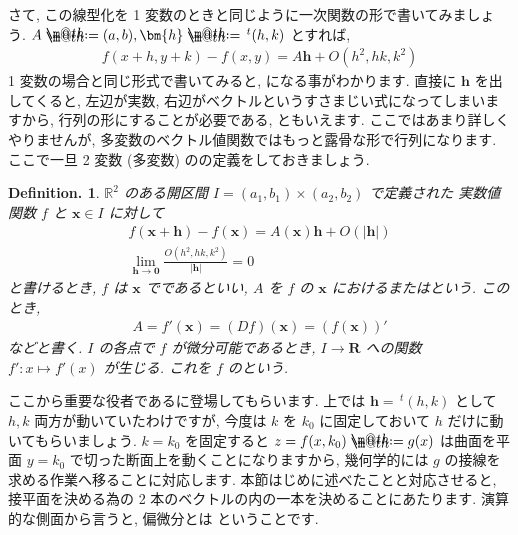 \documentclass[openany, a4paper, oneside]{book}
\makeatletter
\newcommand*{\defeq}{\mathrel{\rlap{%
\raisebox{0.3ex}{$\m@th\cdot$}}%
\raisebox{-0.3ex}{$\m@th\cdot$}}%
=}
\theoremstyle{break}
\theoremstyle{breakdefn}
\newtheorem{defn}[thm]{Definition.}
\newcommand{\bbR}{\mathbb{R}}
\makeatother
\begin{document}
さて, この線型化を 1 変数のときと同じように一次関数の形で書いてみましょう.
 $A\defeq(a,b),\bm{h}\defeq\,^t (h,k)$ とすれば,
    \begin{align}
        f (x+h,y+k) - f (x,y)
        =
        A \bm{h} + O (h^2,hk,k^2)
    \end{align}
1 変数の場合と同じ形式で書いてみると, になる事がわかります.
直接に $\bm{h}$ を出してくると, 左辺が実数, 右辺がベクトルというすさまじい式になってしまいますから, 行列の形にすることが必要である, ともいえます.
ここではあまり詳しくやりませんが, 多変数のベクトル値関数ではもっと露骨な形で行列になります.
ここで一旦 2 変数 (多変数) のの定義をしておきましょう.
    \begin{defn} $\bbR^2$ のある開区間 $I=(a_1,b_1)\times (a_2,b_2)$ で定義された
実数値関数 $f$ と $\bm{x} \in I$ に対して
    \begin{gather}
        f (\bm{x}+\bm{h}) - f (\bm{x}) = A (\bm{x})\bm{h} + O\left ( |\bm{h}| \right) \\
        \lim_{\bm{h} \to \bm{0}}\frac{O (h^2,hk,k^2 )}{|\bm{h}|}=0
    \end{gather}
と書けるとき,  $f$ は $\bm{x}$ でであるといい,
 $A$ を $f$ の $\bm{x}$ におけるまたはという.
このとき,
    \begin{align}       A=f'(\bm{x})=(Df) (\bm{x})=\left ( f (\bm{x}) \right) '
    \end{align}
などと書く.  $I$ の各点で $f$ が微分可能であるとき,  $I \to \bm{R}$ への関数
 $f':x \mapsto f'(x)$ が生じる. これを $f$ のという.
\end{defn}

ここから重要な役者であるに登場してもらいます.
上では $\bm{h}=\,^t (h,k)$ として $h,k$ 両方が動いていたわけですが, 今度は $k$ を $k_0$ に固定しておいて $h$ だけに動いてもらいましょう.
 $k=k_0$ を固定すると $z=f (x,k_0)\defeq g (x)$ は曲面を平面 $y=k_0$ で切った断面上を動くことになりますから,
幾何学的には $g$ の接線を求める作業へ移ることに対応します.
本節はじめに述べたことと対応させると, 接平面を決める為の 2 本のベクトルの内の一本を決めることにあたります.
演算的な側面から言うと, 偏微分とは
ということです.
\end{document}
